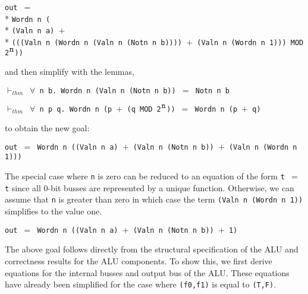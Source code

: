 \begin{normalsize}
\begin{minipage}{17.5cm}
\verb"out "$=$\\*
\phantom{\verb"ou"}\verb"Wordn n ("\\*
\phantom{\verb"ou"\verb"Wo"}\verb"(Valn n a) "$+$\\*
\phantom{\verb"ou"\verb"Wo"}\verb"(((Valn n (Wordn n (Valn n (Notn n b)))) "$+$\verb" (Valn n (Wordn n 1))) MOD 2"$^{\verb"n"}$\verb"))"
\end{minipage}

and then simplify with the lemmas,

$\vdash_{thm}$\verb" "$\forall$\verb" n b. Wordn n (Valn n (Notn n b)) "$=$\verb" Notn n b"

$\vdash_{thm}$\verb" "$\forall$\verb" n p q. Wordn n (p "$+$\verb" (q MOD 2"$^{\verb"n"}$\verb")) "$=$\verb" Wordn n (p "$+$\verb" q)"

to obtain the new goal:

\hspace*{\fill}
\verb"out "$=$\verb" Wordn n ((Valn n a) "$+$\verb" (Valn n (Notn n b)) "$+$\verb" (Valn n (Wordn n 1)))"
\hspace*{\fill}

The special case where \verb"n" is zero can be reduced to an equation
of the form \mbox{\verb"t "$=$\verb" t"} since all $0$-bit busses are
represented by a unique function.
Otherwise, we can assume that \verb"n" is greater than zero in which
case the term \verb"(Valn n (Wordn n 1))" simplifies to the value one.

\hspace*{\fill}
\verb"out "$=$\verb" Wordn n ((Valn n a) "$+$\verb" (Valn n (Notn n b)) "$+$\verb" 1)"
\hspace*{\fill}

The above goal follows directly from the structural specification
of the ALU and correctness results for the ALU components.
To show this, we first derive equations for the
internal busses and output bus of the ALU.
These equations have already been simplified for
the case where \mbox{\verb"(f0,f1)"} is equal to \mbox{\verb"(T,F)"}.


\end{normalsize}
